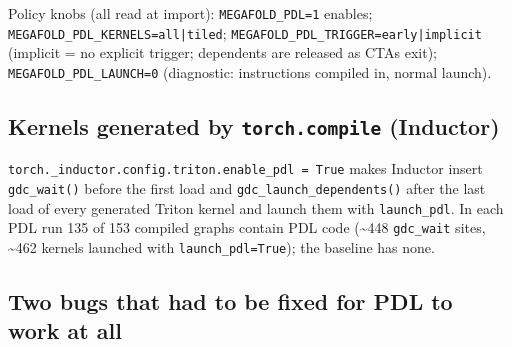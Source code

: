 \documentclass[10pt]{article}
\begin{document}
Policy knobs (all read at import): \texttt{MEGAFOLD\_PDL=1} enables; \texttt{MEGAFOLD\_PDL\_KERNELS=all|tiled}; \texttt{MEGAFOLD\_PDL\_TRIGGER=early|implicit} (implicit = no explicit trigger; dependents are released as CTAs exit); \texttt{MEGAFOLD\_PDL\_LAUNCH=0} (diagnostic: instructions compiled in, normal launch).


\subsection{Kernels generated by \texttt{torch.compile} (Inductor)}

\texttt{torch.\_inductor.config.triton.enable\_pdl = True} makes Inductor insert \texttt{gdc\_wait()} before the first load and \texttt{gdc\_launch\_dependents()} after the last load of every generated Triton kernel and launch them with \texttt{launch\_pdl}. In each PDL run 135 of 153 compiled graphs contain PDL code (\textasciitilde{}448 \texttt{gdc\_wait} sites, \textasciitilde{}462 kernels launched with \texttt{launch\_pdl=True}); the baseline has none.


\subsection{Two bugs that had to be fixed for PDL to work at all}
\end{document}
